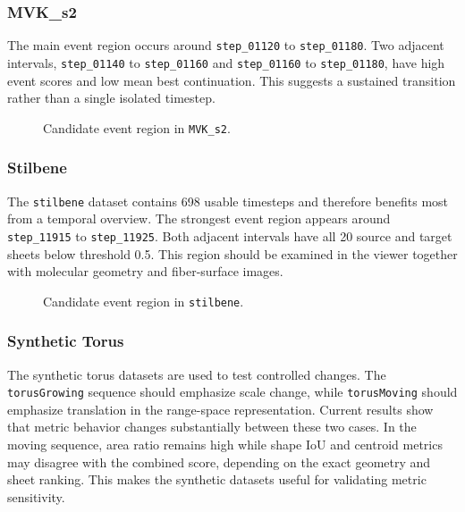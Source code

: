 \subsubsection{MVK\_s2}

The main event region occurs around \texttt{step\_01120} to
\texttt{step\_01180}. Two adjacent intervals,
\texttt{step\_01140} to \texttt{step\_01160} and \texttt{step\_01160} to
\texttt{step\_01180}, have high event scores and low mean best continuation.
This suggests a sustained transition rather than a single isolated timestep.

\begin{figure}[t]
  \caption{Candidate event region in \texttt{MVK\_s2}.}
  \label{fig:mvk-s2-case}
\end{figure}

\subsubsection{Stilbene}

The \texttt{stilbene} dataset contains 698 usable timesteps and therefore
benefits most from a temporal overview. The strongest event region appears
around \texttt{step\_11915} to \texttt{step\_11925}. Both adjacent intervals
have all 20 source and target sheets below threshold 0.5. This region should be
examined in the viewer together with molecular geometry and fiber-surface
images.

\begin{figure}[t]
  \caption{Candidate event region in \texttt{stilbene}.}
  \label{fig:stilbene-case}
\end{figure}

\subsubsection{Synthetic Torus}

The synthetic torus datasets are used to test controlled changes. The
\texttt{torusGrowing} sequence should emphasize scale change, while
\texttt{torusMoving} should emphasize translation in the range-space
representation. Current results show that metric behavior changes substantially
between these two cases. In the moving sequence, area ratio remains high while
shape IoU and centroid metrics may disagree with the combined score, depending
on the exact geometry and sheet ranking. This makes the synthetic datasets
useful for validating metric sensitivity.

